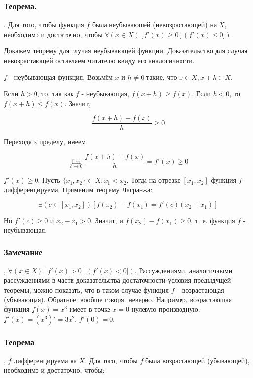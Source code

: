 \subsubsection{Теорема.}

\fXR.
Для того, чтобы функция $f$ была неубываюшей (невозрастающей) на $X$, необходимо и достаточно, чтобы
$\forall(x \in X) [f'(x) \geq 0] (f'(x) \leq 0])$.

\dokvo 

Докажем теорему для случая неубывающей функции. Доказательство для случая невозрастающей оставляем читателю ввиду его аналогичности.

\neobh

$f$ - неубывающая функция. Возьмём $x$ и $h \neq 0$ такие, что $x\in X, x+h \in X$.

Если $h>0$, то, так как $f$ - неубывающая, $f(x+h) \geq f(x)$.
Если $h<0$, то $f(x+h) \leq f(x)$.
Значит, 

$$
\frac{ f(x+h) - f(x) }{ h } \geq 0
$$

Переходя к пределу, имеем

\[
\lim_{h\to 0} { \frac{ f(x+h) - f(x) }{ h } } = f'(x) \geq 0
\]

\dost

$f'(x) \geq 0$. Пусть $\{x_1,x_2\} \subset X, x_1 < x_2$.
Тогда на отрезке $[x_1, x_2]$ функция $f$ дифференцируема. Применим теорему Лагранжа:

$$
\exists(c \in [ x_1, x_2 ]) [f(x_2) - f(x_1) = f'(c)(x_2 - x_1)]
$$

Но $f'(c) \geq 0$ и $x_2 - x_1 > 0$. Значит, и $f(x_2) - f(x_1) \geq 0$, т. е. функция $f$ - неубывающая.

\dokno


\subsubsection{Замечание}
\fXR, $\forall(x \in X) [f'(x) > 0] (f'(x) < 0])$.
Рассуждениями, аналогичными рассуждениями в части доказательства достаточности условия предыдущей теоремы, можно показать, что в таком случае функция $f$ -- возрастающая (убывающая).
Обратное, вообще говоря, неверно.
Например, возрастающая функция $f(x)=x^3$ имеет в точке $x=0$ нулевую производную:
$f'(x)=(x^3)'=3x^2$, $f'(0)=0$.

\subsubsection{Теорема}
\fXR, $f$ дифференцируема на $X$.
Для того, чтобы $f$ была возрастающей (убывающей), необходимо и достаточно, чтобы:

